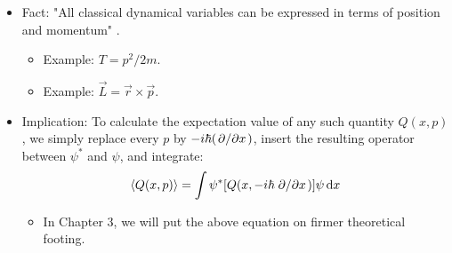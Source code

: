 \documentclass[../notes.tex]{subfiles}
\begin{document}
\begin{itemize}
\begin{itemize}
        \item Fact: "All classical dynamical variables can be expressed in terms of position and momentum" \parencite[33]{bib:Griffiths}.
        \begin{itemize}
            \item Example: $T=p^2/2m$.
            \item Example: $\vec{L}=\vec{r}\times\vec{p}$.
        \end{itemize}
        \item Implication: To calculate the expectation value of any such quantity $Q(x,p)$, we simply replace every $p$ by $-i\hbar(\pdv*{x})$, insert the resulting operator between $\psi^*$ and $\psi$, and integrate:
        \begin{equation*}
            \langle{Q(x,p)}\rangle = \int\psi^*[Q(x,-i\hbar\pdv*{x})]\psi\dd{x}
        \end{equation*}
        \begin{itemize}
            \item In Chapter 3, we will put the above equation on firmer theoretical footing.
        \end{itemize}
    \end{itemize}
\end{itemize}
\end{document}
